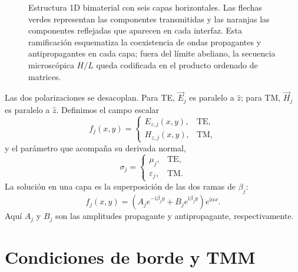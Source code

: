 \documentclass[10pt,a4paper]{article}
\newcommand{\ii}{\mathrm{i}}
\newcommand{\vE}{\vec{E}}
\newcommand{\vH}{\vec{H}}
\begin{document}
\begin{figure}[t]
\caption{Estructura 1D bimaterial con seis capas horizontales. Las flechas verdes representan las componentes transmitidas y las naranjas las componentes reflejadas que aparecen en cada interfaz. Esta ramificaci\'on esquematiza la coexistencia de ondas propagantes y antipropagantes en cada capa; fuera del l\'imite abeliano, la secuencia microsc\'opica $H/L$ queda codificada en el producto ordenado de matrices.}
\label{fig:stack-hl}
\end{figure}

Las dos polarizaciones se desacoplan. Para TE, $\vE_j$ es paralelo a $\hat z$; para TM, $\vH_j$ es paralelo a $\hat z$. Definimos el campo escalar
\begin{equation}
f_j(x,y)=
\begin{cases}
E_{z,j}(x,y),&\mathrm{TE},\\
H_{z,j}(x,y),&\mathrm{TM},
\end{cases}
\end{equation}
y el par\'ametro que acompa\~na su derivada normal,
\begin{equation}
\sigma_j=
\begin{cases}
\mu_j,&\mathrm{TE},\\
\varepsilon_j,&\mathrm{TM}.
\end{cases}
\label{eq:sigma}
\end{equation}
La soluci\'on en una capa es la superposici\'on de las dos ramas de $\beta_j$:
\begin{equation}
f_j(x,y)=
\left(A_j e^{-\ii\beta_j y}+B_j e^{\ii\beta_j y}\right)e^{\ii\alpha x}.
\label{eq:onda-capa}
\end{equation}
Aqu\'i $A_j$ y $B_j$ son las amplitudes propagante y antipropagante, respectivamente.

\section{Condiciones de borde y TMM}
\end{document}
